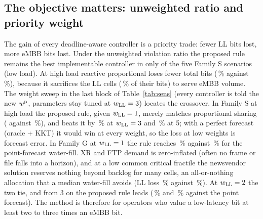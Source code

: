 \documentclass[conference]{IEEEtran}
\begin{document}
\begin{table}[t]
\caption{Family G: $V_w$ (\%; mean, $\pm$ std at high load, \nSeedsTgpp{} seeds), LL and unweighted ratio at high load, and $\Delta$ = paired change of $V_w$ to the proposed rule at high load (\%, negative favours proposed; seeds won; $^{\ast}$/$^{\ast\ast}$: Holm-corrected $p<0.05$/$0.01$)}
\label{tab:tgpp}
\centering
\scriptsize
\setlength{\tabcolsep}{3pt}

\end{table}

\subsection{The objective matters: unweighted ratio and priority weight}
\label{sec:weights}
The gain of every deadline-aware controller is a priority trade: fewer LL bits lost, more eMBB bits lost. Under the unweighted violation ratio the proposed rule remains the best implementable controller in only \unwBestCount{} of the five Family S scenarios (low load). At high load reactive proportional loses fewer total bits (\meanhighreactivepropUnw{}\,\% against \meanhighproposedUnw{}\,\%), because it sacrifices the LL cells (\meanhighreactivepropLL{}\,\% of their bits) to serve eMBB volume. The weight sweep in the last block of Table~\ref{tab:sens} (every controller is told the new $w^{\rm p}$, parameters stay tuned at $w_{\rm LL} = 3$) locates the crossover. In Family S at high load the proposed rule, given $w_{\rm LL} = 1$, merely matches proportional sharing (\wthighWoneproposed{} against \wthighWonereactiveprop{}\,\%), and beats it by \wthighWthreereactivepropRed{}\,\% at $w_{\rm LL} = 3$ and \wthighWfivereactivepropRed{}\,\% at 5; with a perfect forecast (oracle + KKT) it would win at every weight, so the loss at low weights is forecast error. In Family G at $w_{\rm LL} = 1$ the rule reaches \wttgpphighWoneproposed{}\,\% against \wttgpphighWonepointforecast{}\,\% for the point-forecast water-fill. XR and FTP demand is zero-inflated (often no frame or file falls into a horizon), and at a low common critical fractile the newsvendor solution reserves nothing beyond backlog for many cells, an all-or-nothing allocation that a median water-fill avoids (LL loss \wttgpphighWoneproposedLL{}\,\% against \wttgpphighWonepointforecastLL{}\,\%). At $w_{\rm LL} = 2$ the two tie, and from 3 on the proposed rule leads (\wttgpphighWthreepointforecastRed{}\,\% and \wttgpphighWfivepointforecastRed{}\,\% against the point forecast). The method is therefore for operators who value a low-latency bit at least two to three times an eMBB bit.
\end{document}
